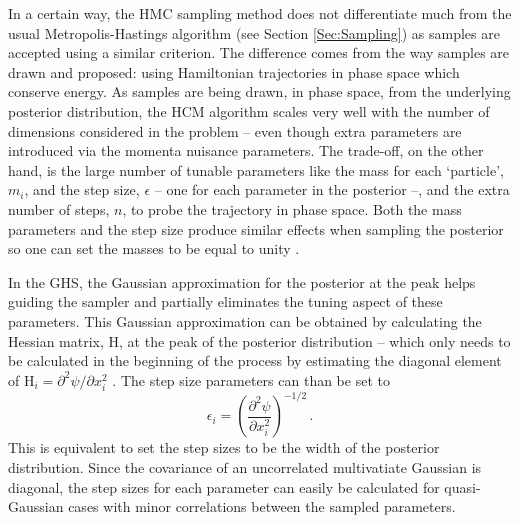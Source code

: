 \qquad In a certain way, the HMC sampling method does not differentiate much from the usual Metropolis-Hastings algorithm (see Section \ref{Sec:Sampling}) as samples are accepted using a similar criterion. The difference comes from the way samples are drawn and proposed: using Hamiltonian trajectories in phase space which conserve energy. As samples are being drawn, in phase space, from the underlying posterior distribution, the HCM algorithm scales very well with the number of dimensions considered in the problem -- even though extra parameters are introduced via the momenta nuisance parameters. The trade-off, on the other hand, is the large number of tunable parameters like the mass for each  `particle', $m_i$, and the step size, $\epsilon$ -- one for each parameter in the posterior --, and the extra number of steps, $n$, to probe the trajectory in phase space. Both the mass parameters and the step size produce similar effects when sampling the posterior so one can set the masses to be equal to unity \citep{Neal1996}. 

\qquad In the GHS, the Gaussian approximation for the posterior at the peak helps guiding the sampler and partially eliminates the tuning aspect of these parameters. This Gaussian approximation can be obtained by calculating the Hessian matrix, $\bm{\mathrm{H}}$, at the peak of the posterior distribution -- which only needs to be calculated in the beginning of the process by estimating the diagonal element of $\mathrm{H}_i = \partial^2 \psi/\partial x_i^2$ \citep{SreeThesis,2013-GuidedHamiltonian}. The step size parameters can than be set to
\begin{equation}
    \label{Eq:BPL:StepSizeVector}
    \epsilon_i = \left( \frac{\partial^2 \psi}{\partial x_i^2}\right)^{-1/2}\, .
\end{equation}
This is equivalent to set the step sizes to be the width of the posterior distribution. Since the covariance of an uncorrelated multivatiate Gaussian is diagonal, the step sizes for each parameter can easily be calculated for quasi-Gaussian cases with minor correlations between the sampled parameters. 

